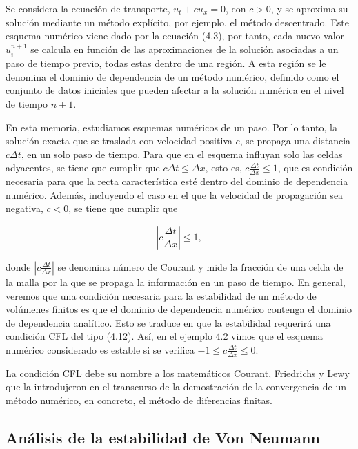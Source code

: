Se considera la ecuación de transporte, $u_t+cu_x=0$, con $c>0$, y se
aproxima su solución mediante un método explícito, por ejemplo, el
método descentrado.
Este esquema numérico viene dado por la ecuación (4.3), por tanto,
cada nuevo valor $u^{n+1}_{i}$ se calcula en función de las
aproximaciones de la solución asociadas a un paso de tiempo previo,
todas estas dentro de una región.
A esta región se le denomina el dominio de dependencia de un método
numérico, definido como el conjunto de datos iniciales que pueden
afectar a la solución numérica en el nivel de tiempo $n+1$.

En esta memoria, estudiamos esquemas numéricos de un paso.
Por lo tanto, la solución exacta que se traslada con velocidad
positiva $c$, se propaga una distancia $c\Delta t$, en un solo paso
de tiempo.
Para que en el esquema inﬂuyan solo las celdas adyacentes, se tiene
que cumplir que $c\Delta t\leq\Delta x$, esto es,
$c\frac{\Delta t}{\Delta x}\leq 1$, que es condición necesaria para
que la recta característica esté dentro del dominio de dependencia
numérico.
Además, incluyendo el caso en el que la velocidad de propagación sea
negativa, $c<0$, se tiene que cumplir que

\begin{equation*}
  \left|
  c\frac{\Delta t}{\Delta x}
  \right|\leq
  1,
\end{equation*}

donde
\begin{math}
  \left|
  c\frac{\Delta t}{\Delta x}
  \right|
\end{math}
se denomina número de Courant y mide la fracción de una celda de la
malla por la que se propaga la información en un paso de tiempo.
En general, veremos que una condición necesaria para la estabilidad
de un método de volúmenes finitos es que el dominio de dependencia
numérico contenga el dominio de dependencia analítico.
Esto se traduce en que la estabilidad requerirá una condición CFL del
tipo (4.12).
Así, en el ejemplo 4.2 vimos que el esquema numérico considerado es
estable si se verifica
\begin{math}
  -1\leq
  c\frac{\Delta t}{\Delta x}\leq
  0
\end{math}.

La condición CFL debe su nombre a los matemáticos Courant, Friedrichs
y Lewy que la introdujeron en el transcurso de la demostración de la
convergencia de un método numérico, en concreto, el método de
diferencias finitas.

\subsection{Análisis de la estabilidad de Von Neumann}

